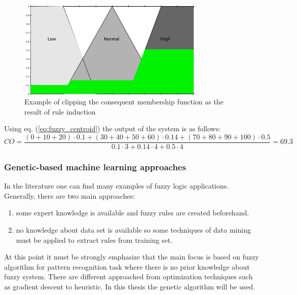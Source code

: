 \begin{enumerate}
\begin{equation}
        \end{equation}
        \begin{figure}[H]
            \begin{center}
                \includegraphics[width=0.8\textwidth, height=0.5\textwidth]{fig/fuzzy_centroid.png}
            \end{center}
            \caption{Example of clipping the consequent membership function
            as the result of rule induction}
            \label{fig:fuzzy_centroid}
        \end{figure}
        Using eq. (\ref{eq:fuzzy_centroid}) the output of the system is as follows:
        $$
        CO = \frac{(0+10+20)\cdot 0.1 + (30+40+50+60)\cdot 0.14 + (70 + 80 + 90
        + 100)\cdot 0.5}{0.1\cdot 3 + 0.14\cdot 4 + 0.5\cdot 4 } = 69.3
        $$

\end{enumerate}
\subsubsection{Genetic-based machine learning approaches}
In the literature one can find many examples of fuzzy logic applications.
Generally, there are two main approaches:
\begin{enumerate}
    \item some expert knowledge is available and fuzzy rules are created
        beforehand.
    \item no knowledge about data set is available so some techniques of data
        mining must be applied to extract rules from training set.
\end{enumerate}
At this point it must be strongly emphasize that the main focus is based on
fuzzy algorithm for pattern recognition task where there is no prior knowledge 
about fuzzy system. There are different approached from optimization techniques
such as gradient descent to heuristic. In this thesis the genetic algorithm
will be used. 

